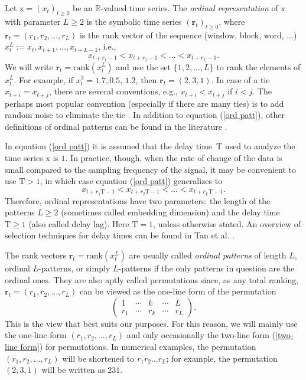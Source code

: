 \documentclass[%
 aip,
 amsmath,amssymb,
 reprint,%
]{revtex4-1}
\begin{document}
Let $\mathrm{x}=(x_{t})_{t\geq 0}$ be an $\mathbb{R}$-valued time series.
The \textit{ordinal representation} of $\mathrm{x}$ with parameter $L\geq 2$
is the symbolic time series $(\mathbf{r}_{t})_{t\geq 0}$, where $\mathbf{r}%
_{t}=(r_{1},r_{2},...,r_{L})$ is the rank vector of the sequence (window,
block, word, ...) $x_{t}^{L}:=x_{t},x_{t+1},...,x_{t+L-1}$, i.e., 
\begin{equation}
x_{t+r_{1}-1}<x_{t+r_{2}-1}<\ldots <x_{t+r_{L}-1}.  \label{ord patt}
\end{equation}%
We will write $\mathbf{r}_{t}=\mathrm{rank}(x_{t}^{L})$ and use the set $%
\{1,2,...,L\}$ to rank the elements of $x_{t}^{L}$. For example, if $%
x_{t}^{3}=1.7,$\thinspace $0.5,\,1.2$, then $\mathbf{r}_{t}=(2,3,1)$. In
case of a tie $x_{t+i}=x_{t+j}$, there are several conventions, e.g., $%
x_{t+i}<x_{t+j}$ if $i<j$. The perhaps most popular convention (especially
if there are many ties) is to add random noise to eliminate the tie \cite%
{Myers2020}. In addition to equation (\ref{ord patt}), other definitions of
ordinal patterns can be found in the literature \cite{Bian2012,Unakafova2013,Schnurr2022}.

In equation (\ref{ord patt}) it is assumed that the delay time\ \textrm{T}
used to analyze the time series $\mathrm{x}$ is $1$. In practice, though,
when the rate of change of the data is small compared to the sampling
frequency of the signal, it may be convenient to use $\mathrm{T}>1$, in
which case equation (\ref{ord patt}) generalizes to%
\begin{equation}
x_{t+r_{1}\mathrm{T}-1}<x_{t+r_{2}\mathrm{T}-1}<\ldots <x_{t+r_{L}\mathrm{T}%
-1}.  \label{ord patt 2}
\end{equation}%
Therefore, ordinal representations have two parameters: the length of the
patterns $L\geq 2$ (sometimes called embedding dimension) and the delay time 
$\mathrm{T}\geq 1$ (also called delay lag). Here $\mathrm{T}=1$, unless otherwise
stated. An overview of selection techniques for delay times can be found in Tan et al. \cite{Tan2023}.

The rank vectors $\mathbf{r}_{t}=\mathrm{rank}(x_{t}^{L})$ are usually
called \textit{ordinal patterns} of length $L$, ordinal $L$-patterns, or
simply $L$-patterns if the only patterns in question are the ordinal ones.
They are also aptly called permutations since, as any total ranking, $%
\mathbf{r}_{t}=(r_{1},r_{2},...,r_{L})$ can be viewed as the one-line form
of the permutation%
\begin{equation}
\left( 
\begin{array}{ccccc}
1 & \cdots & k & \cdots & L \\ 
r_{1} & \cdots & r_{k} & \cdots & r_{L}%
\end{array}%
\right) .  \label{two-line form}
\end{equation}%
This is the view that best suits our purposes. For this reason, we will
mainly use the one-line form $(r_{1},r_{2},...,r_{L})$ and only occasionally
the two-line form (\ref{two-line form}) for permutations. In numerical
examples, the permutation $(r_{1},r_{2},...,r_{L})$ will be shortened to $%
r_{1}r_{2}...r_{L}$; for example, the permutation $(2,3,1)$ will be written
as $231$.
\end{document}
